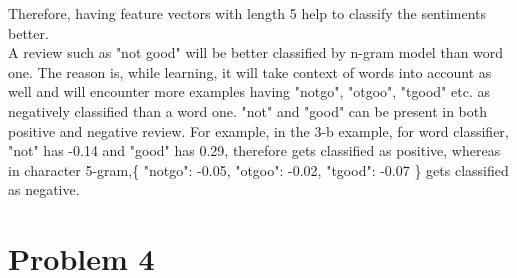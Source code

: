 \documentclass[12pt]{article}
\begin{document}
\begin{enumerate}[label=(\alph*)]
	Therefore, having feature vectors with length 5 help to classify the sentiments better. \\
	
	A review such as "not good" will be better classified by n-gram model than word one. The reason is, while learning, it will take context of words into account as well and will encounter more examples having "notgo", "otgoo", "tgood" etc. as negatively classified than a word one. "not" and "good" can be present in both positive and negative review. For example, in the 3-b example, for word classifier, "not" has -0.14 and "good" has 0.29, therefore gets classified as positive, whereas in character 5-gram,\{ "notgo": -0.05, "otgoo": -0.02, "tgood": -0.07 \} gets classified as negative. 


\end{enumerate}

\section*{Problem 4}
\end{document}
